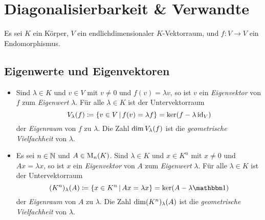 \chapter{Diagonalisierbarkeit \& Verwandte}

Es sei $K$ ein Körper, $V$ ein endlichdimensionaler $K$-Vektorraum, und $f \colon V \to V$ ein Endomorphismus.





\section{Eigenwerte und Eigenvektoren}

\begin{definition}
  \begin{itemize}
    \item
      Sind $\lambda \in K$ und $v \in V$ mit $v \neq 0$ und $f(v) = \lambda v$, so ist $v$ ein \emph{Eigenvektor} von $f$ zum \emph{Eigenwert} $\lambda$.
      Für alle $\lambda \in K$ ist der Untervektorraum
      \[
                  V_{\lambda}(f)
        \coloneqq \{ v \in V \,|\, f(v) = \lambda f \}
        =         \ker (f - \lambda \operatorname{id}_V)
      \]
      der \emph{Eigenraum} von $f$ zu $\lambda$.
      Die Zahl $\dim V_{\lambda}(f)$ ist die \emph{geometrische Vielfachheit} von $\lambda$.
    \item
      Es sei $n \in \mathbb{N}$ und $A \in \operatorname{M}_{n}(K)$.
      Sind $\lambda \in K$ und $x \in K^n$ mit $x \neq 0$ und $Ax = \lambda x$, so ist $x$ ein \emph{Eigenvektor} von $A$ zum \emph{Eigenwert} $\lambda$.
      Für alle $\lambda \in K$ ist der Untervektorraum
      \[
                  \eigenspace{(K^n)}{A}{\lambda}
        \coloneqq \{ x \in K^n \suchthat Ax = \lambda x \}
        =         \ker (A - \lambda \Id)
      \]
      der \emph{Eigenraum} von $A$ zu $\lambda$.
      Die Zahl $\dim (K^n)_{\lambda}(A)$ ist die \emph{geometrische Vielfachheit} von $\lambda$.
  \end{itemize}
\end{definition}

